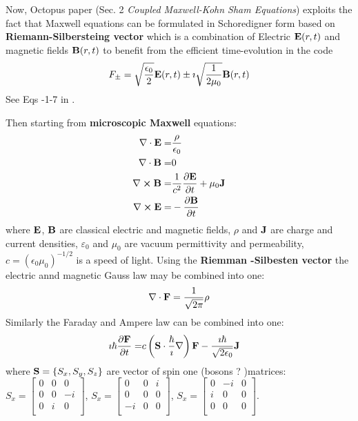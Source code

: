 \documentclass[11pt]{article}
\begin{document}
Now, Octopus  paper \cite{octopus-rt-tddft-JCP-2020} (Sec. 2 \emph{Coupled Maxwell-Kohn Sham Equations}) exploits the fact that Maxwell  equations can be formulated  in Schoredigner form based on {\bf  Riemann-Silbersteing vector } which is a combination of  Electric $\vb E(r,t)$ and magnetic fields $\vb B(r,t)$ to benefit from the efficient time-evolution   in the code
\begin{align*}
    F_ \pm =  \sqrt{\frac{\epsilon_0}{2}}  \vb E(r,t) \pm \imath   \sqrt{\frac{1}{2\mu_0}}  \vb B(r,t) 
\end{align*}
 See Eqs -1-7 in \cite{octopus-rt-tddft-JCP-2020}.

 Then starting  from {\bf microscopic Maxwell } equations:
\begin{align*}
    \nabla \cdot \vb E  =& \frac{\rho}{\epsilon_0} \\
    \nabla \cdot \vb B  =& 0 \\ 
    \nabla \cross \vb B =& \frac{1}{c^2} \pdv{\vb E}{t} +\mu_0 \vb J \\
    \nabla \cross \vb E = & -\pdv{\vb B}{t}
\end{align*} 
where $\vb E$, $\vb B$ are classical electric and magnetic fields, $\rho$ and $\vb J$  are charge and current densities, $\varepsilon_0$  and $\mu_0$ are vacuum permittivity and permeability, $c = (\epsilon_0 \mu_0)^{-1/2}$ is a speed of light. Using the {\bf Riemman -Silbesten vector }  the electric annd magnetic Gauss law may be combined into one: 
\begin{align}
    \nabla \cdot \vb F = \frac{1}{\sqrt{ 2\pi}} \rho
\end{align}
 Similarly the Faraday and Ampere law can be combined into one:
\begin{align}
   \imath \hbar  \pdv{ \vb F}{t}  
   = &  c \left(\vb S \cdot \frac{\hbar}{\imath} \nabla  \right)  \vb F - \frac{\imath \hbar}{\sqrt{ 2\epsilon_0}} \vb J
\end{align}
 where $\vb S=\{S_x, S_y, S_z \}$ are vector of spin one (bosons ? )matrices: \newline
 $S_x = \begin{bmatrix}
0&0&0\\
0&0&-i\\
0&i&0\\
\end{bmatrix} $, 
 $S_x = \begin{bmatrix}
0&0&i\\
0&0&0\\
-i&0&0\\
\end{bmatrix} $,
 $S_x = \begin{bmatrix}
0&-i&0\\
i&0&0\\
0&0&0\\
\end{bmatrix} $.
\end{document}
